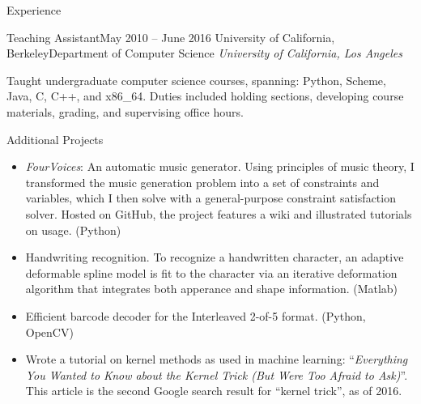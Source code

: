 \documentclass{resume}
\begin{document}
\begin{component}{Experience}
\vspace{-0.25em}

	\begin{position}{Teaching Assistant}{May 2010 -- June 2016}
		{University of California, Berkeley}{Department of Computer Science}
    \emph{University of California, Los Angeles}

	{Taught undergraduate computer science courses, spanning: Python, Scheme, Java, C, C++, and x86\_64.
	 Duties included holding sections, developing course materials, grading, and supervising office hours.}
	\end{position}
\end{component}

\vspace{-1em}

\begin{component}{Additional Projects}
	\begin{itemize}
		\vspace{-0.5em}\item \emph{FourVoices}: An automatic music generator.
Using principles of music theory, I transformed the music generation problem into a set of constraints and variables, which I then solve with a general-purpose constraint satisfaction solver.
Hosted on GitHub, the project features a wiki and illustrated tutorials on usage.
		(Python)
        \vspace{-0.5em}\item Handwriting recognition.
To recognize a handwritten character, an adaptive deformable spline model is fit to the character via an iterative deformation algorithm that integrates both apperance and shape information.
(Matlab)
        \vspace{-0.5em}\item Efficient barcode decoder
	        for the Interleaved 2-of-5 format. (Python, OpenCV)
        \vspace{-0.5em}\item Wrote a tutorial on kernel methods as used in machine learning: ``\emph{Everything You Wanted to Know about the Kernel Trick (But Were Too Afraid to Ask)}''. This article is the second Google search result for ``kernel trick'', as of 2016.

\end{itemize}
\end{component}
\end{document}
